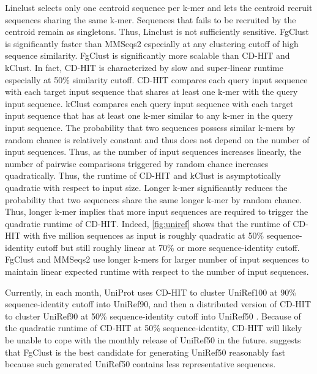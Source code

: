 \documentclass[11pt,letterpaper]{article}
\begin{document}
Linclust selects only one centroid sequence per k-mer and lets the centroid recruit sequences sharing the same k-mer.
Sequences that fails to be recruited by the centroid remain as singletons.
Thus, Linclust is not sufficiently sensitive.
FgClust is significantly faster than MMSeqs2 especially at any clustering cutoff of high sequence similarity.
FgClust is significantly more scalable than CD-HIT and kClust. 
In fact, CD-HIT is characterized by slow and super-linear runtime especially at 50\% similarity cutoff.
CD-HIT compares each query input sequence with each target input sequence that shares at least one k-mer with the query input sequence.
kClust compares each query input sequence with each target input sequence that has at least one k-mer similar to any k-mer in the query input sequence.
The probability that two sequences possess similar k-mers by random chance is relatively constant and thus does not depend on the number of input sequences.
Thus, as the number of input sequences increases linearly, the number of pairwise comparisons triggered by random chance increases quadratically.
Thus, the runtime of CD-HIT and kClust is asymptotically quadratic with respect to input size.
Longer k-mer significantly reduces the probability that two sequences share the same longer k-mer by random chance.
Thus, longer k-mer implies that more input sequences are required to trigger the quadratic runtime of CD-HIT.
Indeed, \cref{fig:uniref} shows that the runtime of CD-HIT with five million sequences as input is roughly quadratic at 50\% sequence-identity cutoff but still roughly linear at 70\% or more sequence-identity cutoff.
FgClust and MMSeqs2 use longer k-mers for larger number of input sequences to maintain linear expected runtime with respect to the number of input sequences.

Currently, in each month, UniProt uses CD-HIT to cluster UniRef100 at 90\% sequence-identity cutoff into UniRef90, and then a distributed version of CD-HIT to cluster UniRef90 at 50\% sequence-identity cutoff into UniRef50 \citep{suzek2014uniref}.
Because of the quadratic runtime of CD-HIT at 50\% sequence-identity, CD-HIT will likely be unable to cope with the monthly release of UniRef50 in the future.
 suggests that FgClust is the best candidate for generating UniRef50 reasonably fast because such generated UniRef50 contains less representative sequences.
\end{document}
